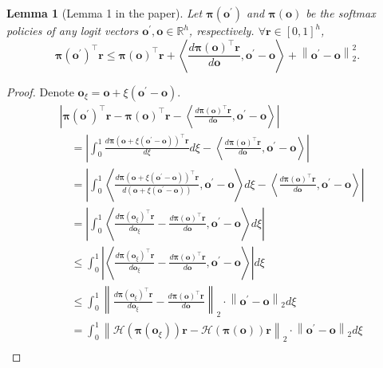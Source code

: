 \documentclass[10pt]{article}
\def\rvo{{\mathbf{o}}}
\def\rvr{{\mathbf{r}}}
\def\rvo{{\mathbf{o}}}
\newtheorem{lem}{Lemma}
\def\rvpi{{\boldsymbol{\pi}}}
\def\sR{{\mathbb{R}}}
\def\gH{{\mathcal{H}}}
\begin{document}
\begin{lem}[Lemma 1 in the paper]
\label{lem:logit_smoothness}
Let $\rvpi\left( \rvo^\prime \right)$ and $\rvpi\left( \rvo \right)$ be the softmax policies of any logit vectors $\rvo^\prime, \rvo \in \sR^h$, respectively. $\forall \rvr \in \left[ 0, 1\right]^h$,
\begin{equation*}
    \rvpi\left( \rvo^\prime \right)^\top \rvr \le \rvpi\left( \rvo \right)^\top \rvr + \left\langle \frac{d \rvpi\left( \rvo \right)^\top \rvr}{d \rvo}, \rvo^\prime - \rvo \right\rangle + \left\| \rvo^\prime - \rvo \right\|_2^2.
\end{equation*}
\end{lem}
\begin{proof}
Denote $\rvo_{\xi} = \rvo + \xi \left( \rvo^\prime - \rvo \right)$.
\begin{equation*}
\begin{split}
    &\left| \rvpi\left( \rvo^\prime \right)^\top \rvr - \rvpi\left( \rvo \right)^\top \rvr - \left\langle \frac{d \rvpi\left( \rvo \right)^\top \rvr}{d \rvo}, \rvo^\prime - \rvo \right\rangle \right| \\
    &\quad = \left| \int_0^1{ \frac{d \rvpi\left( \rvo + \xi \left( \rvo^\prime - \rvo \right) \right)^\top \rvr}{d \xi} d\xi} - \left\langle \frac{d \rvpi\left( \rvo \right)^\top \rvr}{d \rvo}, \rvo^\prime - \rvo \right\rangle \right| \\
    &\quad = \left| \int_0^1{ \left\langle \frac{d \rvpi\left( \rvo + \xi \left( \rvo^\prime - \rvo \right) \right)^\top \rvr}{d \left( \rvo + \xi \left( \rvo^\prime - \rvo \right) \right)}, \rvo^\prime - \rvo \right\rangle d\xi} - \left\langle \frac{d \rvpi\left( \rvo \right)^\top \rvr}{d \rvo}, \rvo^\prime - \rvo \right\rangle \right| \\
    &\quad = \left| \int_0^1{ \left\langle \frac{d \rvpi\left( \rvo_{\xi} \right)^\top \rvr}{d \rvo_{\xi}} - \frac{d \rvpi\left( \rvo \right)^\top \rvr}{d \rvo}, \rvo^\prime - \rvo \right\rangle d\xi} \right| \\
    &\quad \le \int_0^1{ \left| \left\langle \frac{d \rvpi\left( \rvo_{\xi} \right)^\top \rvr}{d \rvo_{\xi}} - \frac{d \rvpi\left( \rvo \right)^\top \rvr}{d \rvo}, \rvo^\prime - \rvo \right\rangle \right| d\xi} \\
    &\quad \le \int_0^1{ \left\| \frac{d \rvpi\left( \rvo_{\xi} \right)^\top \rvr}{d \rvo_{\xi}} - \frac{d \rvpi\left( \rvo \right)^\top \rvr}{d \rvo} \right\|_2 \cdot \left\| \rvo^\prime - \rvo \right\|_2 d\xi} \\
    &\quad = \int_0^1{ \left\| \gH\left( \rvpi\left( \rvo_{\xi} \right)\right) \rvr - \gH\left( \rvpi\left( \rvo \right)\right) \rvr \right\|_2 \cdot \left\| \rvo^\prime - \rvo \right\|_2 d\xi} \\

\end{split}
\end{equation*}
\end{proof}
\end{document}
